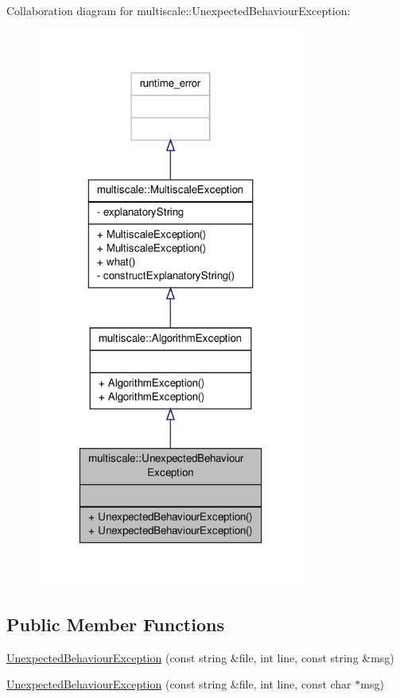 Collaboration diagram for multiscale\-:\-:Unexpected\-Behaviour\-Exception\-:
\nopagebreak
\begin{figure}[H]
\begin{center}
\leavevmode
\includegraphics[width=250pt]{classmultiscale_1_1UnexpectedBehaviourException__coll__graph}
\end{center}
\end{figure}
\subsection*{Public Member Functions}
\begin{DoxyCompactItemize}
\item 
\hyperlink{classmultiscale_1_1UnexpectedBehaviourException_a99903f4c6c5f1746cb15f0ccf2c1233b}{Unexpected\-Behaviour\-Exception} (const string \&file, int line, const string \&msg)
\item 
\hyperlink{classmultiscale_1_1UnexpectedBehaviourException_adc0d1294e28ffd3eed251a60832d43bc}{Unexpected\-Behaviour\-Exception} (const string \&file, int line, const char $\ast$msg)
\end{DoxyCompactItemize}


